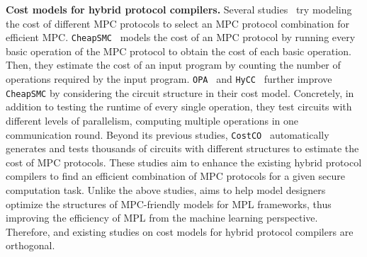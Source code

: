 \noindent\textbf{Cost models for hybrid protocol compilers.}  Several studies~\cite{costco, HyCC, OPA, CheapSMC,10179397} try modeling the cost of different MPC protocols to select an MPC protocol combination for efficient MPC. \texttt{CheapSMC}~\cite{CheapSMC} models the cost of an MPC protocol by running every basic operation of the MPC protocol to obtain the cost of each basic operation. Then, they estimate the cost of an input program by counting the number of operations required by the input program. \texttt{OPA}~\cite{OPA} and \texttt{HyCC}~\cite{HyCC} further improve \texttt{CheapSMC} by considering the circuit structure in their cost model. Concretely, in addition to testing the runtime of every single operation, they test circuits with different levels of parallelism,  computing multiple operations in one communication round. Beyond its previous studies, \texttt{CostCO}~\cite{costco} automatically generates and tests thousands of circuits with different structures to estimate the cost of MPC protocols. These studies aim to enhance the existing hybrid protocol compilers to find an efficient combination of MPC protocols for a given secure computation task. Unlike the above studies, \hawkeye aims to help model designers optimize the structures of MPC-friendly models for MPL frameworks, thus improving the efficiency of MPL from the machine learning perspective. Therefore, \hawkeye and existing studies on cost models for hybrid protocol compilers are orthogonal.


